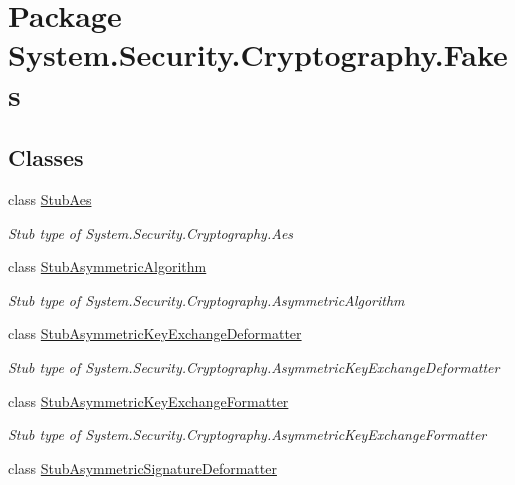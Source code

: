 \hypertarget{namespace_system_1_1_security_1_1_cryptography_1_1_fakes}{\section{Package System.\-Security.\-Cryptography.\-Fakes}
\label{namespace_system_1_1_security_1_1_cryptography_1_1_fakes}
}
\subsection*{Classes}
\begin{DoxyCompactItemize}
\item 
class \hyperlink{class_system_1_1_security_1_1_cryptography_1_1_fakes_1_1_stub_aes}{Stub\-Aes}
\begin{DoxyCompactList}\small\item\em Stub type of System.\-Security.\-Cryptography.\-Aes\end{DoxyCompactList}\item 
class \hyperlink{class_system_1_1_security_1_1_cryptography_1_1_fakes_1_1_stub_asymmetric_algorithm}{Stub\-Asymmetric\-Algorithm}
\begin{DoxyCompactList}\small\item\em Stub type of System.\-Security.\-Cryptography.\-Asymmetric\-Algorithm\end{DoxyCompactList}\item 
class \hyperlink{class_system_1_1_security_1_1_cryptography_1_1_fakes_1_1_stub_asymmetric_key_exchange_deformatter}{Stub\-Asymmetric\-Key\-Exchange\-Deformatter}
\begin{DoxyCompactList}\small\item\em Stub type of System.\-Security.\-Cryptography.\-Asymmetric\-Key\-Exchange\-Deformatter\end{DoxyCompactList}\item 
class \hyperlink{class_system_1_1_security_1_1_cryptography_1_1_fakes_1_1_stub_asymmetric_key_exchange_formatter}{Stub\-Asymmetric\-Key\-Exchange\-Formatter}
\begin{DoxyCompactList}\small\item\em Stub type of System.\-Security.\-Cryptography.\-Asymmetric\-Key\-Exchange\-Formatter\end{DoxyCompactList}\item 
class \hyperlink{class_system_1_1_security_1_1_cryptography_1_1_fakes_1_1_stub_asymmetric_signature_deformatter}{Stub\-Asymmetric\-Signature\-Deformatter}

\end{DoxyCompactItemize}
